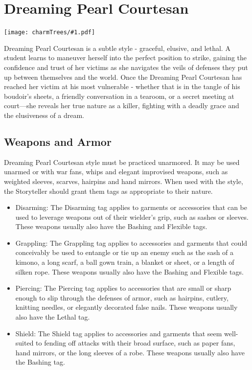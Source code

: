 \documentclass[oneside]{book}
\newenvironment{Ability}[1]{%
  \section{#1}%
  \vspace{-0.25in}\texttt{[image: charmTrees/\#1.pdf]}%
  \begin{multicols}{2}
}
{
  \end{multicols}
}
\begin{document}
\begin{Ability}{Dreaming Pearl Courtesan}
  \par Dreaming Pearl Courtesan is a subtle style - graceful, elusive, and lethal. A student learns to maneuver herself into the perfect position to strike, gaining the confidence and trust of her victims as she navigates the veils of defenses they put up between themselves and the world. Once the Dreaming Pearl Courtesan has reached her victim at his most vulnerable - whether that is in the tangle of his boudoir's sheets, a friendly conversation in a tearoom, or a secret meeting at court—she reveals her true nature as a killer, fighting with a deadly grace and the elusiveness of a dream.

  \subsection*{Weapons and Armor}
  Dreaming Pearl Courtesan style must be practiced unarmored. It may be used unarmed or with war fans, whips and elegant improvised weapons, such as weighted sleeves, scarves, hairpins and hand mirrors. When used with the style, the Storyteller should grant them tags as appropriate to their nature.

  \begin{itemize}
    \item Disarming: The Disarming tag applies to garments or accessories that can be used to leverage weapons out of their wielder's grip, such as sashes or sleeves. These weapons usually also have the Bashing and Flexible tags.
    \item Grappling: The Grappling tag applies to accessories and garments that could conceivably be used to entangle or tie up an enemy such as the sash of a kimono, a long scarf, a ball gown train, a blanket or sheet, or a length of silken rope. These weapons usually also have the Bashing and Flexible tags.
    \item Piercing: The Piercing tag applies to accessories that are small or sharp enough to slip through the defenses of armor, such as hairpins, cutlery, knitting needles, or elegantly decorated false nails. These weapons usually also have the Lethal tag.
    \item Shield: The Shield tag applies to accessories and garments that seem well-suited to fending off attacks with their broad surface, such as paper fans, hand mirrors, or the long sleeves of a robe. These weapons usually also have the Bashing tag.
  \end{itemize}


\end{Ability}
\end{document}
